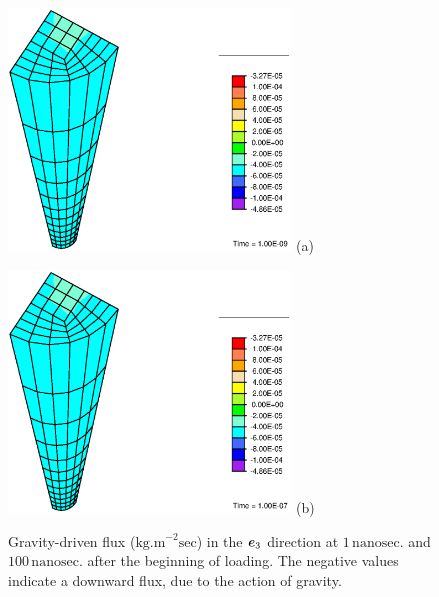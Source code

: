 \begin{figure}[ht]
\begin{minipage}[t]{7.5cm}
{\includegraphics[width=7.5cm]{images/M3-1.eps}} \hskip 3cm (a)
\end{minipage}
\begin{minipage}[t]{7.5cm}
{\includegraphics[width=7.5cm]{images/M3-100.eps}} \hskip 3cm (b)
\end{minipage}
\caption{Gravity-driven flux ($\mathrm{kg.m}^{-2}\mathrm{sec}$) in
the $\mbox{\boldmath$ e$}_3$ direction at $1 \,\mathrm{nanosec.}$ and
$100\,\mathrm{nanosec.}$ after the beginning of loading. The
negative values indicate a downward flux, due to the action of
gravity.} \label{M3fig}
\end{figure}

